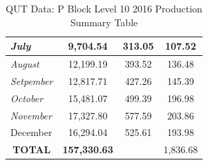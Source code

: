 \begin{table}[H]
\begin{tabular}{|l|c|c|c|}
		\textit{July}                        & 9,704.54                                                                   & 313.05                                                                   & 107.52                                                                                   \\ \hline
		\textit{August}                      & 12,199.19                                                                  & 393.52                                                                   & 136.48                                                                                   \\ \hline
		\textit{Setpember}                   & 12,817.71                                                                  & 427.26                                                                   & 145.39                                                                                   \\ \hline
		\textit{October}                     & 15,481.07                                                                  & 499.39                                                                   & 196.98                                                                                   \\ \hline
		\textit{November}                    & 17,327.80                                                                  & 577.59                                                                   & 203.86                                                                                   \\ \hline
		December                             & 16,294.04                                                                  & 525.61                                                                   & 193.98                                                                                   \\ \hline
		\multicolumn{1}{|c|}{\textbf{TOTAL}} & \textbf{157,330.63}                                                        & \textbf{}                                                                & 1,836.68                                                                                 \\ \hline
	\end{tabular}
	\caption{QUT Data: P Block Level 10 2016 Production Summary Table}
	\label{table:qut-pv-lvl10-2016}
\end{table}

